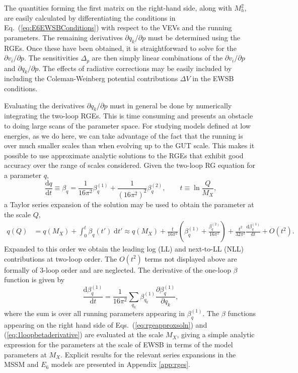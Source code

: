 \documentclass[preprint,amsmath,amssymb,aps,superscriptaddress,prd,
showpacs,floatfix,nofootinbib]{revtex4-1}
\begin{document}
The quantities forming the first matrix on the right-hand side, along
with $M_h^2$, are easily calculated by differentiating the conditions in
Eq.~(\ref{eq:E6EWSBConditions}) with respect to the VEVs and the running
parameters.  The remaining derivatives $\partial q_k /\partial p$ must be
determined using the RGEs.  Once these have been obtained, it is
straightforward to solve for the $\partial v_i / \partial p$.  The
sensitivities $\Delta_p$ are then simply linear combinations of the
$\partial v_i / \partial p$ and $\partial q_k / \partial p$.  The effects of
radiative corrections may be easily included by including the
Coleman-Weinberg potential contributions $\Delta V$ in the EWSB conditions.

Evaluating the derivatives $\partial q_k / \partial p$ must in general be
done by numerically integrating the two-loop RGEs.  This is time consuming
and presents an obstacle to doing large scans of the parameter space.  For
studying models defined at low energies, as we do here, we can take advantage
of the fact that the running is over much smaller scales than when
evolving up to the GUT scale.  This makes it possible to use approximate
analytic solutions to the RGEs that exhibit good accuracy over the range of
scales considered.  Given the two-loop RG equation for a parameter $q$,
\begin{equation} \label{eq:rge}
\frac{\textrm{d}q}{\mathrm{d}t} \equiv \beta_q = \frac{1}{16\pi^2}
\beta_q^{(1)} + \frac{1}{(16\pi^2)^2} \beta_q^{(2)} , \qquad t \equiv
\ln \frac{Q}{M_X} ,
\end{equation}
a Taylor series expansion of the solution may be used to obtain the
parameter at the scale $Q$,
\begin{align} \label{eq:rgeapproxsoln}
q(Q) &= q(M_X) + \int_0^t \beta_q(t') \; \textrm{d}t' \approx q(M_X) +
\frac{t}{16\pi^2} \left ( \beta_q^{(1)} + \frac{\beta_q^{(2)}}{16\pi^2}
\right ) + \frac{t^2}{32\pi^2} \frac{\textrm{d}\beta_q^{(1)}}{\textrm{d}t}
+ O(t^2) .
\end{align}
Expanded to this order we obtain the leading log (LL) and next-to-LL
(NLL) contributions at two-loop order.  The $O(t^2)$ terms
not displayed above are formally of 3-loop order and are
neglected. The derivative of the one-loop $\beta$ function is given by
\begin{equation} \label{eq:1loopbetaderivative}
\frac{\textrm{d}\beta_q^{(1)}}{\textrm{d}t} = \frac{1}{16\pi^2} \sum_{q_k}
\beta_{q_k}^{(1)} \frac{\partial \beta_q^{(1)}}{\partial q_k} ,
\end{equation}
where the sum is over all running parameters appearing in
$\beta_q^{(1)}$.  The $\beta$ functions appearing on the right hand side of
Eqs.~(\ref{eq:rgeapproxsoln}) and (\ref{eq:1loopbetaderivative}) are
evaluated at the scale $M_X$, giving a simple analytic expression for the
parameters at the scale of EWSB in terms of the model parameters at $M_X$.
Explicit results for the relevant series expansions in the MSSM and $E_6$
models are presented in Appendix \ref{app:rges}.
\end{document}
